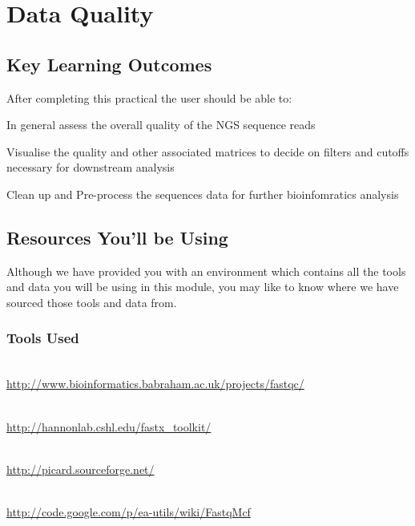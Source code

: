 \renewcommand{\moduleTitle}{Data Quality}
\renewcommand{\moduleAuthors}{%
  Sonika Tyagi \mailto{sonika.tyagi@agrf.org.au}
} \renewcommand{\moduleContributions}{%
  Nathan S. Watson-Haigh \mailto{nathan.watson-haigh@awri.com.au}%
}

\chapter{\moduleTitle}
\newpage

\section{Key Learning Outcomes}

After completing this practical the user should be able to:
\item In general assess the overall quality of the NGS sequence reads\\
\item Visualise the quality and other associated matrices to decide on filters and cutoffs necessary for downstream analysis\\
\item Clean up and Pre-process the sequences data for further bioinfomratics analysis \\

\section{Resources You'll be Using}
Although we have provided you with an environment which contains all the tools
and data you will be using in this module, you may like to know where we have
sourced those tools and data from.
 
\subsection{Tools Used}
\begin{description}[style=multiline,labelindent=0cm,align=left,leftmargin=0.5cm]
  \item[FastQC]\hfill\\
  	\url{http://www.bioinformatics.babraham.ac.uk/projects/fastqc/}
  \item[fastx-toolkit]\hfill\\
  	\url{http://hannonlab.cshl.edu/fastx_toolkit/}
  \item[picard]\hfill\\
  	\url{http://picard.sourceforge.net/}
  \item[fastqmcf]\hfill\\
  	\url{http://code.google.com/p/ea-utils/wiki/FastqMcf}
\end{description}

